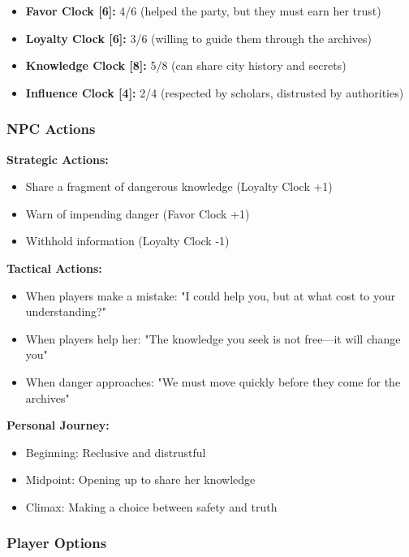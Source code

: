 \begin{itemize}
  \item \textbf{Favor Clock [6]:} 4/6 (helped the party, but they must earn her trust)
  \item \textbf{Loyalty Clock [6]:} 3/6 (willing to guide them through the archives)
  \item \textbf{Knowledge Clock [8]:} 5/8 (can share city history and secrets)
  \item \textbf{Influence Clock [4]:} 2/4 (respected by scholars, distrusted by authorities)
\end{itemize}

\subsubsection{NPC Actions}

\textbf{Strategic Actions:}
\begin{itemize}
  \item Share a fragment of dangerous knowledge (Loyalty Clock +1)
  \item Warn of impending danger (Favor Clock +1)
  \item Withhold information (Loyalty Clock -1)
\end{itemize}

\textbf{Tactical Actions:}
\begin{itemize}
  \item When players make a mistake: "I could help you, but at what cost to your understanding?"
  \item When players help her: "The knowledge you seek is not free---it will change you"
  \item When danger approaches: "We must move quickly before they come for the archives"
\end{itemize}

\textbf{Personal Journey:}
\begin{itemize}
  \item Beginning: Reclusive and distrustful
  \item Midpoint: Opening up to share her knowledge
  \item Climax: Making a choice between safety and truth
\end{itemize}

\subsubsection{Player Options}

